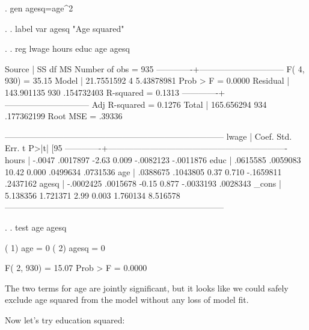 \documentclass[12pt]{article}
\begin{document}
\begin{stlog}
  
. gen agesq=age^2

. 
. label var agesq "Age squared"

. 
. reg lwage hours educ age agesq

      Source |       SS       df       MS              Number of obs =     935
-------------+------------------------------           F(  4,   930) =   35.15
       Model |  21.7551592     4  5.43878981           Prob > F      =  0.0000
    Residual |  143.901135   930  .154732403           R-squared     =  0.1313
-------------+------------------------------           Adj R-squared =  0.1276
       Total |  165.656294   934  .177362199           Root MSE      =  .39336

------------------------------------------------------------------------------
       lwage |      Coef.   Std. Err.      t    P>|t|     [95%
-------------+----------------------------------------------------------------
       hours |     -.0047   .0017897    -2.63   0.009    -.0082123   -.0011876
        educ |   .0615585   .0059083    10.42   0.000     .0499634    .0731536
         age |   .0388675   .1043805     0.37   0.710    -.1659811    .2437162
       agesq |  -.0002425   .0015678    -0.15   0.877    -.0033193    .0028343
       _cons |   5.138356   1.721371     2.99   0.003     1.760134    8.516578
------------------------------------------------------------------------------

. 
. test age agesq

 ( 1)  age = 0
 ( 2)  agesq = 0

       F(  2,   930) =   15.07
            Prob > F =    0.0000

\end{stlog}

The two terms for age are jointly significant, but it looks like we
could safely exclude age squared from the model without any loss of
model fit. 

Now let's try education squared:
\end{document}
